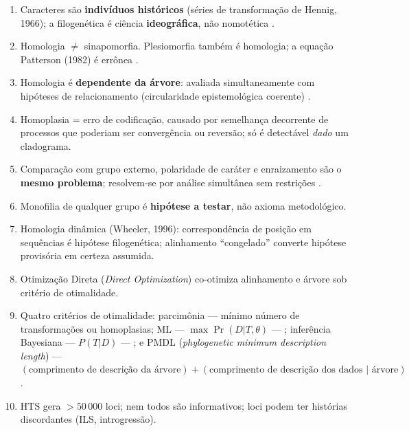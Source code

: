 \clearpage
\begin{revise}
\begin{enumerate}
    \item Caracteres são \textbf{indivíduos históricos} (séries de transformação de Hennig, 1966); a filogenética é ciência \textbf{ideográfica}, não nomotética \parencite{grant2004}.
    \item Homologia $\neq$ sinapomorfia. Plesiomorfia também é homologia; a equação Patterson (1982) é errônea \parencite{nixon2011}.
    \item Homologia é \textbf{dependente da árvore}: avaliada simultaneamente com hipóteses de relacionamento (circularidade epistemológica coerente) \parencite{nixon1993}.
    \item Homoplasia = erro de codificação, causado por semelhança decorrente de processos que poderiam ser convergência ou reversão; só é detectável \textit{dado} um cladograma.
    \item Comparação com grupo externo, polaridade de caráter e enraizamento são o \textbf{mesmo problema}; resolvem-se por análise simultânea sem restrições \parencite{nixon1993}.
    \item Monofilia de qualquer grupo é \textbf{hipótese a testar}, não axioma metodológico.
    \item Homologia dinâmica (Wheeler, 1996): correspondência de posição em sequências é hipótese filogenética; alinhamento ``congelado'' converte hipótese provisória em certeza assumida.
    \item Otimização Direta (\textit{Direct Optimization}) \parencite{wheeler2006} co-otimiza alinhamento e árvore sob critério de otimalidade.
    \item Quatro critérios de otimalidade: parcimônia --- mínimo número de transformações ou homoplasias; ML --- $\max \Pr(D|T,\theta)$ --- ; inferência Bayesiana --- $P(T|D)$ --- ; e PMDL (\textit{phylogenetic minimum description length}) --- $(\text{comprimento de descrição da árvore}) + (\text{comprimento de descrição dos dados } | \text{ árvore})$.
    \item HTS gera $>50\,000$ loci; nem todos são informativos; loci podem ter histórias discordantes (ILS, introgressão).
\end{enumerate}
\end{revise}

\clearpage

\printbibliography[heading=subbibliography,title={Referências}]

